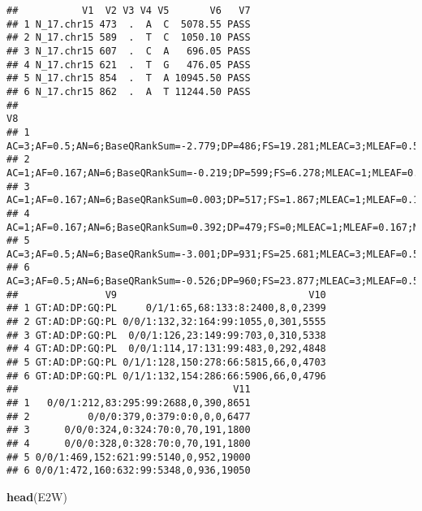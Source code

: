\documentclass[
]{article}
\newenvironment{Shaded}{\begin{snugshade}}{\end{snugshade}}
\newcommand{\FunctionTok}[1]{\textcolor[rgb]{0.13,0.29,0.53}{\textbf{#1}}}
\newcommand{\NormalTok}[1]{#1}
\begin{document}
\begin{verbatim}
##           V1  V2 V3 V4 V5       V6   V7
## 1 N_17.chr15 473  .  A  C  5078.55 PASS
## 2 N_17.chr15 589  .  T  C  1050.10 PASS
## 3 N_17.chr15 607  .  C  A   696.05 PASS
## 4 N_17.chr15 621  .  T  G   476.05 PASS
## 5 N_17.chr15 854  .  T  A 10945.50 PASS
## 6 N_17.chr15 862  .  A  T 11244.50 PASS
##                                                                                                                                            V8
## 1  AC=3;AF=0.5;AN=6;BaseQRankSum=-2.779;DP=486;FS=19.281;MLEAC=3;MLEAF=0.5;MQ=55.98;MQRankSum=-5.233;QD=11.87;ReadPosRankSum=-3.689;SOR=0.168
## 2 AC=1;AF=0.167;AN=6;BaseQRankSum=-0.219;DP=599;FS=6.278;MLEAC=1;MLEAF=0.167;MQ=52.76;MQRankSum=-6.611;QD=6.4;ReadPosRankSum=-1.859;SOR=0.782
## 3 AC=1;AF=0.167;AN=6;BaseQRankSum=0.003;DP=517;FS=1.867;MLEAC=1;MLEAF=0.167;MQ=52.37;MQRankSum=-6.171;QD=4.67;ReadPosRankSum=-3.407;SOR=0.621
## 4     AC=1;AF=0.167;AN=6;BaseQRankSum=0.392;DP=479;FS=0;MLEAC=1;MLEAF=0.167;MQ=52.36;MQRankSum=-5.439;QD=3.63;ReadPosRankSum=-4.578;SOR=0.661
## 5  AC=3;AF=0.5;AN=6;BaseQRankSum=-3.001;DP=931;FS=25.681;MLEAC=3;MLEAF=0.5;MQ=57.59;MQRankSum=-8.876;QD=12.18;ReadPosRankSum=-1.463;SOR=1.539
## 6   AC=3;AF=0.5;AN=6;BaseQRankSum=-0.526;DP=960;FS=23.877;MLEAC=3;MLEAF=0.5;MQ=57.37;MQRankSum=-9.178;QD=12.25;ReadPosRankSum=-0.53;SOR=1.408
##               V9                                 V10
## 1 GT:AD:DP:GQ:PL     0/1/1:65,68:133:8:2400,8,0,2399
## 2 GT:AD:DP:GQ:PL 0/0/1:132,32:164:99:1055,0,301,5555
## 3 GT:AD:DP:GQ:PL  0/0/1:126,23:149:99:703,0,310,5338
## 4 GT:AD:DP:GQ:PL  0/0/1:114,17:131:99:483,0,292,4848
## 5 GT:AD:DP:GQ:PL 0/1/1:128,150:278:66:5815,66,0,4703
## 6 GT:AD:DP:GQ:PL 0/1/1:132,154:286:66:5906,66,0,4796
##                                     V11
## 1   0/0/1:212,83:295:99:2688,0,390,8651
## 2          0/0/0:379,0:379:0:0,0,0,6477
## 3      0/0/0:324,0:324:70:0,70,191,1800
## 4      0/0/0:328,0:328:70:0,70,191,1800
## 5 0/0/1:469,152:621:99:5140,0,952,19000
## 6 0/0/1:472,160:632:99:5348,0,936,19050
\end{verbatim}

\begin{Shaded}
\begin{Highlighting}[]
\FunctionTok{head}\NormalTok{(E2W)}
\end{Highlighting}
\end{Shaded}
\end{document}
